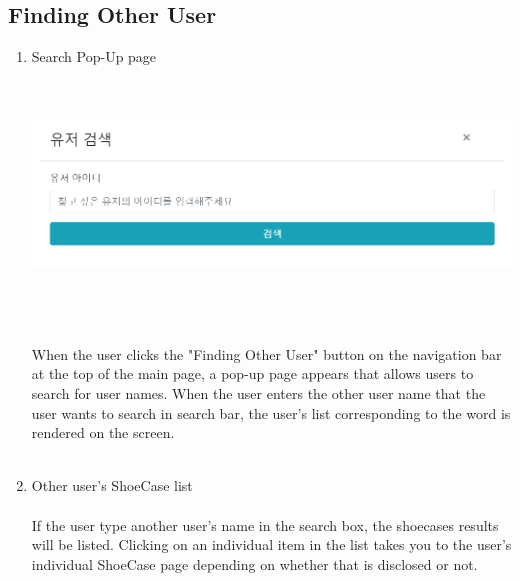 \documentclass[conference]{IEEEtran}
\begin{document}
\subsection{Finding Other User}
\begin{enumerate}
	\item Search Pop-Up page\\\\
\\\centerline{\includegraphics[scale=0.35]{pics/finding_user.png}}\\\\
\\When the user clicks the "Finding Other User" button on the navigation bar at the top of the main page, a pop-up page appears that allows users to search for user names. When the user enters the other user name that the user wants to search in search bar, the user's list corresponding to the word is rendered on the screen.\\\\
	\item Other user's ShoeCase list\\
\\If the user type another user's name in the search box, the shoecases results will be listed.
Clicking on an individual item in the list takes you to the user's individual ShoeCase page depending on whether that is disclosed or not.\\\\
\end{enumerate}
\end{document}
